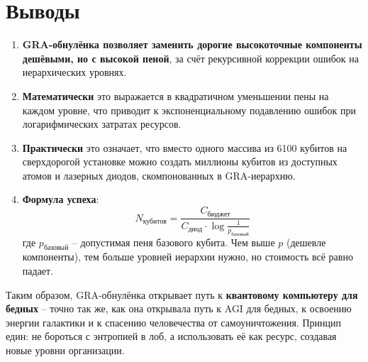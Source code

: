 \documentclass[12pt,a4paper]{article}
\begin{document}
\section{Выводы}

\begin{enumerate}
    \item \textbf{GRA-обнулёнка позволяет заменить дорогие высокоточные компоненты дешёвыми, но с высокой пеной}, за счёт рекурсивной коррекции ошибок на иерархических уровнях.
    \item \textbf{Математически} это выражается в квадратичном уменьшении пены на каждом уровне, что приводит к экспоненциальному подавлению ошибок при логарифмических затратах ресурсов.
    \item \textbf{Практически} это означает, что вместо одного массива из 6100 кубитов на сверхдорогой установке можно создать миллионы кубитов из доступных атомов и лазерных диодов, скомпонованных в GRA-иерархию.
    \item \textbf{Формула успеха}:
    \[
    \boxed{N_{\text{кубитов}} = \frac{C_{\text{бюджет}}}{C_{\text{диод}} \cdot \log \frac{1}{p_{\text{базовый}}}}}
    \]
    где \(p_{\text{базовый}}\) – допустимая пеня базового кубита. Чем выше \(p\) (дешевле компоненты), тем больше уровней иерархии нужно, но стоимость всё равно падает.
\end{enumerate}

Таким образом, GRA-обнулёнка открывает путь к \textbf{квантовому компьютеру для бедных} – точно так же, как она открывала путь к AGI для бедных, к освоению энергии галактики и к спасению человечества от самоуничтожения. Принцип един: не бороться с энтропией в лоб, а использовать её как ресурс, создавая новые уровни организации.
\end{document}
